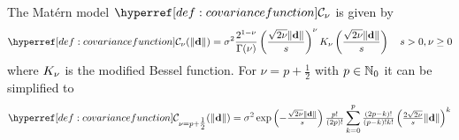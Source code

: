 
\begin{definition}
	The Matérn model \(\C_\nu\) is given by
	\[
		\C_\nu(\|\step\|)
		= \sigma^2 \frac{2^{1-\nu}}{\Gamma(\nu)}
		\left(\frac{\sqrt{2\nu}\|\step\|}{\scale}\right)^\nu
		\modifiedBessel\left(\frac{\sqrt{2\nu}\|\step\|}{\scale}\right)
		\quad \scale >0, \nu \ge 0
	\]
	where \(K_\nu\) is the modified Bessel function. For \(\nu=p+\frac12\)
	with \(p\in\mathbb{N}_0\) it can be simplified \parencite[cf.][sec.
	4.2.1]{williamsGaussianProcessesMachine2006} to
	\[
		\C_{\nu=p+\tfrac12}(\|\step\|)
		= \sigma^2 \exp\left(- \tfrac{\sqrt{2\nu} \|\step\|}{s}\right)\tfrac{p!}{(2p)!}
		\sum_{k=0}^p \tfrac{(2p-k)!}{(p-k)!k!}\left(\tfrac{2\sqrt{2\nu}}{s}\|\step\|\right)^k
		\nonumber
	\]
\end{definition}
